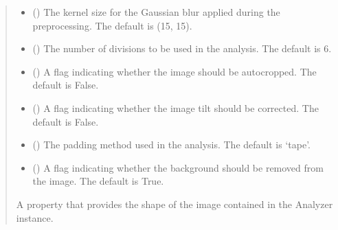 \documentclass[letterpaper,10pt,english]{sphinxmanual}
\begin{document}
\begin{fulllineitems}
\begin{quote}
\begin{description}
\begin{itemize}
\item {} 
\sphinxAtStartPar
{} (\sphinxstyleliteralemphasis{\sphinxupquote{, }}) \textendash{} The kernel size for the Gaussian blur applied during the preprocessing. The default is (15, 15).

\item {} 
\sphinxAtStartPar
{} (\sphinxstyleliteralemphasis{\sphinxupquote{, }}) \textendash{} The number of divisions to be used in the analysis. The default is 6.

\item {} 
\sphinxAtStartPar
{} (\sphinxstyleliteralemphasis{\sphinxupquote{, }}) \textendash{} A flag indicating whether the image should be auto\sphinxhyphen{}cropped. The default is False.

\item {} 
\sphinxAtStartPar
{} (\sphinxstyleliteralemphasis{\sphinxupquote{, }}) \textendash{} A flag indicating whether the image tilt should be corrected. The default is False.

\item {} 
\sphinxAtStartPar
{} (\sphinxstyleliteralemphasis{\sphinxupquote{, }}) \textendash{} The padding method used in the analysis. The default is ‘tape’.

\item {} 
\sphinxAtStartPar
{} (\sphinxstyleliteralemphasis{\sphinxupquote{, }}) \textendash{} A flag indicating whether the background should be removed from the image. The default is True.

\end{itemize}

\begin{description}
\sphinxAtStartPar
A property that provides the shape of the image contained in the Analyzer instance.


\end{description}
\end{description}
\end{quote}
\end{fulllineitems}
\end{document}
